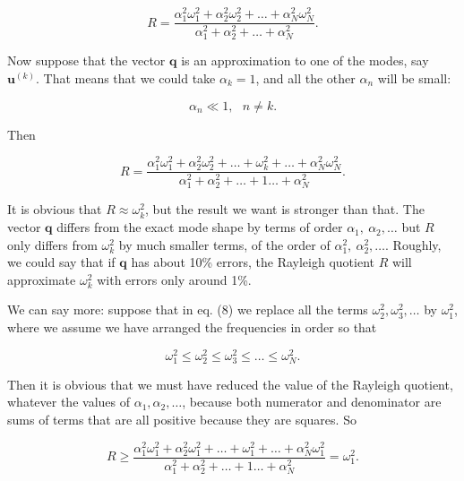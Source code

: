   \begin{equation*}R=\frac{\alpha_1^2 \omega_1^2 + \alpha_2^2 \omega_2^2 + 
  \dots + \alpha_N^2 \omega_N^2 }{\alpha_1^2 + \alpha_2^2 + \dots + \alpha_N^2 
  } .\tag{6}\end{equation*} 

  Now suppose that the vector $\mathbf{q}$ is an approximation to one of the 
  modes, say $\mathbf{u}^{(k)}$. That means that we could take $\alpha_k =1$, 
  and all the other $\alpha_n$ will be small: 

  \begin{equation*}\alpha_n \ll 1,~~~n \ne k .\tag{7}\end{equation*} 

  Then 

  \begin{equation*}R=\frac{\alpha_1^2 \omega_1^2 + \alpha_2^2 \omega_2^2 + 
  \dots+ \omega_k^2 + \dots + \alpha_N^2 \omega_N^2 }{\alpha_1^2 + \alpha_2^2 + 
  \dots + 1 \dots + \alpha_N^2 } .\tag{8}\end{equation*} 

  It is obvious that $R \approx \omega_k^2$, but the result we want is stronger 
  than that. The vector $\mathbf{q}$ differs from the exact mode shape by terms 
  of order $\alpha_1,~\alpha_2, \dots$ but $R$ only differs from $\omega_k^2$ 
  by much smaller terms, of the order of $\alpha_1^2,~\alpha_2^2, \dots$. 
  Roughly, we could say that if $\mathbf{q}$ has about 10\% errors, the 
  Rayleigh quotient $R$ will approximate $\omega_k^2$ with errors only around 
  1\%. 

  We can say more: suppose that in eq. (8) we replace all the terms 
  $\omega_2^2, \omega_3^2, \dots$ by $\omega_1^2$, where we assume we have 
  arranged the frequencies in order so that 

  \begin{equation*}\omega_1^2 \le \omega_2^2 \le \omega_3^2 \le \dots \le 
  \omega_N^2 .\tag{9}\end{equation*} 

  Then it is obvious that we must have reduced the value of the Rayleigh 
  quotient, whatever the values of $\alpha_1, \alpha_2, \dots$, because both 
  numerator and denominator are sums of terms that are all positive because 
  they are squares. So 

  \begin{equation*}R \ge \frac{\alpha_1^2 \omega_1^2 + \alpha_2^2 \omega_1^2 + 
  \dots+ \omega_1^2 + \dots + \alpha_N^2 \omega_1^2 }{\alpha_1^2 + \alpha_2^2 + 
  \dots + 1 \dots + \alpha_N^2} = \omega_1^2 .\tag{10}\end{equation*} 

